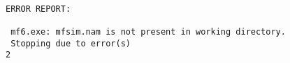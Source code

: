 {\small
\begin{lstlisting}[style=modeloutput]

ERROR REPORT:

 mf6.exe: mfsim.nam is not present in working directory.
 Stopping due to error(s)
2

\end{lstlisting}
}
